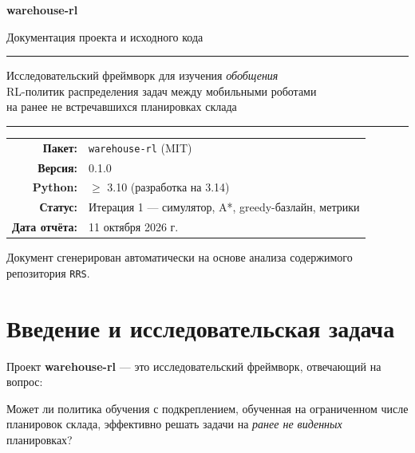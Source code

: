 \documentclass[11pt,a4paper]{article}
\newcommand{\code}[1]{\texttt{#1}}
\begin{document}
\begin{titlepage}
\centering
\vspace*{2.2cm}
{\Huge\bfseries\color{accent} warehouse-rl\par}
\vspace{0.8cm}
{\Large Документация проекта и исходного кода\par}
\vspace{1.2cm}
\rule{0.75\textwidth}{0.6pt}\par
\vspace{0.6cm}
{\large Исследовательский фреймворк для изучения \emph{обобщения}\\
RL-политик распределения задач между мобильными роботами\\
на ранее не встречавшихся планировках склада\par}
\vspace{0.6cm}
\rule{0.75\textwidth}{0.6pt}\par
\vfill
\begin{tabular}{rl}
\textbf{Пакет:}          & \code{warehouse-rl} (MIT) \\[2pt]
\textbf{Версия:}         & 0.1.0 \\[2pt]
\textbf{Python:}         & $\geq$ 3.10 (разработка на 3.14) \\[2pt]
\textbf{Статус:}         & Итерация 1 — симулятор, A*, greedy-базлайн, метрики \\[2pt]
\textbf{Дата отчёта:}    & 11 октября 2026 г. \\
\end{tabular}
\vfill
{\small Документ сгенерирован автоматически на основе анализа содержимого
репозитория \code{RRS}.}
\end{titlepage}

\tableofcontents
\newpage

\section{Введение и исследовательская задача}
Проект \textbf{warehouse-rl} — это исследовательский фреймворк, отвечающий на
вопрос:

\begin{tcolorbox}[colback=accent!5,colframe=accent!60,title=Исследовательский вопрос]
Может ли политика обучения с подкреплением, обученная на ограниченном числе
планировок склада, эффективно решать задачи на \emph{ранее не виденных}
планировках?
\end{tcolorbox}
\end{document}
